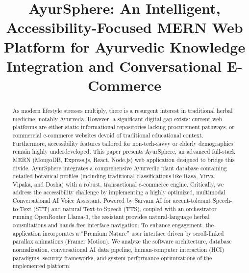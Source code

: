 \documentclass[conference]{IEEEtran}
\begin{document}
\title{AyurSphere: An Intelligent, Accessibility-Focused MERN Web Platform for Ayurvedic Knowledge Integration and Conversational E-Commerce}

\author{
\and
{}
}

\maketitle

\begin{abstract}
As modern lifestyle stresses multiply, there is a resurgent interest in traditional herbal medicine, notably Ayurveda. However, a significant digital gap exists: current web platforms are either static informational repositories lacking procurement pathways, or commercial e-commerce websites devoid of traditional educational context. Furthermore, accessibility features tailored for non-tech-savvy or elderly demographics remain highly underdeveloped. This paper presents AyurSphere, an advanced full-stack MERN (MongoDB, Express.js, React, Node.js) web application designed to bridge this divide. AyurSphere integrates a comprehensive Ayurvedic plant database containing detailed botanical profiles (including traditional classifications like Rasa, Virya, Vipaka, and Dosha) with a robust, transactional e-commerce engine. Critically, we address the accessibility challenge by implementing a highly optimized, multimodal Conversational AI Voice Assistant. Powered by Sarvam AI for accent-tolerant Speech-to-Text (STT) and natural Text-to-Speech (TTS), coupled with an orchestrator running OpenRouter Llama-3, the assistant provides natural-language herbal consultations and hands-free interface navigation. To enhance engagement, the application incorporates a ``Premium Nature'' user interface driven by scroll-linked parallax animations (Framer Motion). We analyze the software architecture, database normalization, conversational AI data pipeline, human-computer interaction (HCI) paradigms, security frameworks, and system performance optimizations of the implemented platform.
\end{abstract}
\end{document}
